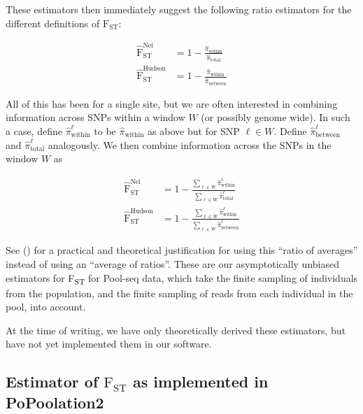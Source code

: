 \documentclass[a4paper,9pt,DIV=14]{scrartcl}
\newcounter{todo}
\newcommand\todo[1]{}
\newcommand{\fst}{F\textsubscript{ST}}
\newcommand\citeay[1]{\citeauthor{#1} (\citeyear{#1}) \cite{#1}}
\begin{document}
These estimators then immediately suggest the following ratio estimators for the different definitions of $\text{F}_\text{ST}$:

\begin{align}
    \widehat{\text{F}}_\text{ST}^\text{Nei} &= 1 - \frac{\widehat{\pi}_\text{within}}{\widehat{\pi}_\text{total}}\\
    \widehat{\text{F}}_\text{ST}^\text{Hudson} &= 1 - \frac{\widehat{\pi}_\text{within}}{\widehat{\pi}_\text{between}}
\end{align}

All of this has been for a single site, but we are often interested in combining information across SNPs within a window $W$ (or possibly genome wide).
In such a case, define $\widehat{\pi}^\ell_\text{within}$ to be $\widehat{\pi}_\text{within}$ as above but for SNP $\ell \in W$.
Define $\widehat{\pi}^\ell_\text{between}$ and $\widehat{\pi}^\ell_\text{total}$ analogously.
We then combine information across the SNPs in the window $W$ as

\begin{align}
    \widehat{\text{F}}_\text{ST}^\text{Nei}    &= 1 - \frac{\sum_{\ell \in W} \widehat{\pi}^\ell_\text{within}} {\sum_{\ell \in W} \widehat{\pi}^\ell_\text{total}} \\
    \widehat{\text{F}}_\text{ST}^\text{Hudson} &= 1 - \frac{\sum_{\ell \in W} \widehat{\pi}^\ell_\text{within}} {\sum_{\ell \in W} \widehat{\pi}^\ell_\text{between}}
\end{align}

See \citeay{Bhatia2013} for a practical and theoretical justification for using this ``ratio of averages'' instead of using an ``average of ratios''.
These are our asymptotically unbiased estimators for \fst{} for Pool-seq data, which take the finite sampling of individuals from the population, and the finite sampling of reads from each individual in the pool, into account.

\todo{Need to update later:}
At the time of writing, we have only theoretically derived these estimators, but have not yet implemented them in our software.
\todo{According to preliminary simulations, these are not biased... etc}


\subsection{Estimator of \texorpdfstring{$\text{F}_\text{ST}$}{FST} as implemented in PoPoolation2}
\label{supp:sec:FST:sub:PoPoolation2Estimator}
\end{document}
